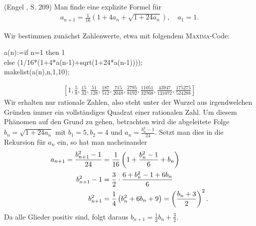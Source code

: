 \documentclass[11pt,a4paper]{article}
\newcommand{\cas}[1]{\textsc{#1}}
\begin{document}
\begin{aufgabe} (Engel \cite{Eng98}, S. 209) 
Man finde eine explizite Formel für
\begin{gather*}
a_{n+1}= \frac{1}{16} \left( 1+4 a_n + \sqrt{1 +24 a_n}\right), \quad a_1=1.
\end{gather*}
\end{aufgabe}

\begin{loesung} 
Wir bestimmen zunächst Zahlenwerte, etwa mit folgendem \cas{Maxima}-Code:
\begin{code}
  a(n):=if n=1 then 1\\
  else (1/16*(1+4*a(n-1)+sqrt(1+24*a(n-1))));\\[6pt]

  makelist(a(n),n,1,10);
\end{code}
\begin{gather*}
  \left[1, \frac{5}{8}, \frac{15}{32}, \frac{51}{128}, \frac{187}{512},
    \frac{715}{2048}, \frac{2795}{8192}, \frac{11051}{32768},
    \frac{43947}{131072}, \frac{175275}{524288}\right]
\end{gather*}
Wir erhalten nur rationale Zahlen, also steht unter der Wurzel aus
irgendwelchen Gründen immer ein vollständiges Quadrat einer rationalen Zahl.
Um diesem Phänomen auf den Grund zu gehen, betrachten wird die abgeleitete
Folge $b_n=\sqrt{1+24a_n}$ mit $b_1=5, b_2=4$ und $a_n=\frac{b_n^2-1}{24}$.
Setzt man dies in die Rekursion für $a_n$ ein, so hat man nacheinander
\begin{align*}
  a_{n+1}=\frac{b_{n+1}^2-1}{24}&=\frac{1}{16}\left(1+\frac{b_n^2-1}{6}+b_n\right)\\
  b_{n+1}^2-1&=\frac{3}{2}\cdot\frac{6+b_n^2-1+6b_n}{6}\\
  b_{n+1}^2&=\frac{1}{4}\left(b_n^2+6b_n+9\right)=\left(\frac{b_n+3}{2}\right)^2.
\end{align*}
Da alle Glieder positiv sind, folgt daraus $b_{n+1} = \frac12 b_n+\frac32.$


\end{loesung}
\end{document}
